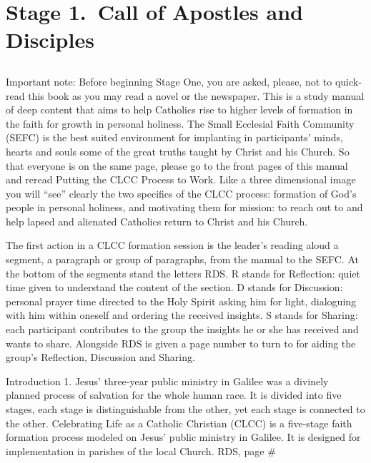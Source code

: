 \documentclass[oneside]{book}
\begin{document}

\chapter{Stage 1.\ Call of Apostles and Disciples}

\section*{} 

Important note:  Before beginning Stage One, you are asked, please, not to
quick-read this book as you may read a novel or the newspaper. This is a study
manual of deep content that aims to help Catholics rise to higher levels of
formation in the faith for growth in personal holiness. The Small Ecclesial
Faith Community (SEFC) is the best suited environment for implanting in
participants' minds, hearts and souls some of the great truths taught by Christ
and his Church. So that everyone is on the same page, please go to the front
pages of this manual and reread Putting the CLCC Process to Work. Like a three
dimensional image you will ``see'' clearly the two specifics of the CLCC
process: formation of God's people in personal holiness, and motivating them for
mission:  to reach out to and help lapsed and alienated Catholics return to
Christ and his Church.

The first action in a CLCC formation session is the leader's reading aloud a
segment, a paragraph or group of paragraphs, from the manual to the SEFC. At the
bottom of the segments stand the letters RDS. R stands for Reflection: quiet
time given to understand the content of the section. D stands for Discussion:
personal prayer time directed to the Holy Spirit asking him for light,
dialoguing with him within oneself and ordering the received insights. S stands
for Sharing: each participant contributes to the group the insights he or she
has received and wants to share. Alongside RDS is given a page number to turn to
for aiding the group's Reflection, Discussion and Sharing.


Introduction
1. Jesus' three-year public ministry in Galilee was a divinely planned process
of salvation for the whole human race. It is divided into five stages, each
stage is distinguishable from the other, yet each stage is connected to the
other. Celebrating Life as a Catholic Christian (CLCC) is a five-stage faith
formation process modeled on Jesus' public ministry in Galilee. It is designed
for implementation in parishes of the local Church.
RDS, page \#
\end{document}
